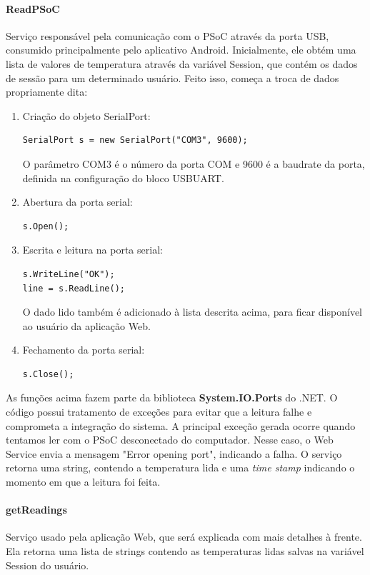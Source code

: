 \documentclass[a4paper,12pt,titlepage]{article}
\begin{document}
			\paragraph{ReadPSoC}
				Serviço responsável pela comunicação com o PSoC através da porta USB, consumido principalmente pelo aplicativo Android. Inicialmente, ele obtém uma lista de valores de temperatura através da variável Session, que contém os dados de sessão para um determinado usuário. Feito isso, começa a troca de dados propriamente dita:
				\begin{enumerate}
					\item Criação do objeto SerialPort:
								\begin{lstlisting}	
SerialPort s = new SerialPort("COM3", 9600);
								\end{lstlisting}
						  O parâmetro COM3 é o número da porta COM e 9600 é a baudrate da porta, definida na configuração do bloco USBUART.
					\item Abertura da porta serial:
								\begin{lstlisting}	
s.Open();
								\end{lstlisting}
					\item Escrita e leitura na porta serial:
								\begin{lstlisting}	
s.WriteLine("OK");
line = s.ReadLine();								
								\end{lstlisting}
							O dado lido também é adicionado à lista descrita acima, para ficar disponível ao usuário da aplicação Web.
					\item Fechamento da porta serial:
								\begin{lstlisting}	
s.Close();
								\end{lstlisting}
																  
				\end{enumerate}
			As funções acima fazem parte da biblioteca \textbf{System.IO.Ports} do .NET.
			O código possui tratamento de exceções para evitar que a leitura falhe e comprometa a integração do sistema. A principal exceção gerada ocorre quando tentamos ler com o PSoC desconectado do computador. Nesse caso, o Web Service envia a mensagem "Error opening port", indicando a falha. 
			O serviço retorna uma string, contendo a temperatura lida e uma \textit{time stamp} indicando o momento em que a leitura foi feita.
		
			\paragraph{getReadings}
				Serviço usado pela aplicação Web, que será explicada com mais detalhes à frente. Ela retorna uma lista de strings contendo as temperaturas lidas salvas na variável Session do usuário. 
				
\end{document}
